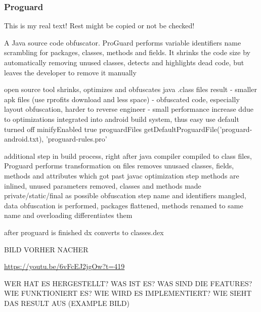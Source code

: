 \subsubsection{Proguard} \label{subsubsection:counter-reengineering-optobf-proguard}
This is my real text! Rest might be copied or not be checked!


%
A Java source code obfuscator. ProGuard performs variable identifiers name scrambling for packages, classes, methods and fields. It shrinks the code size by automatically removing unused classes, detects and highlights dead code, but leaves the developer to remove it manually
\cite{kovachevaMaster}
%

%
open source tool
shrinks, optimizes and obfuscates java .class files
result
- smaller apk files (use rprofits download and less space)
- obfuscated code, especially layout obfuscation, harder to reverse engineer
- small performance increase ddue to optimizations
integrated into android build system, thus easy use
default turned off
minifyEnabled true
proguardFiles getDefaultProguardFile('proguard-android.txt), 'proguard-rules.pro'

additional step in build process, right after java compiler compiled to class files, Proguard performs transformation on files
removes unusaed classes, fields, methods and attributes which got past javac
optimization step methods are inlined, unused parameters removed, classes and methods made private/static/final as possible
obfuscation step name and identifiers mangled, data obfuscation is performed, packages flattened, methods renamed to same name and overloading differentiates them

after proguard is finished dx converts to classes.dex


BILD VORHER NACHER
\cite{munteanLicense}
%



\url{https://youtu.be/6vFcEJ2jgOw?t=419}\newline

WER HAT ES HERGESTELLT? WAS IST ES? WAS SIND DIE FEATURES? WIE FUNKTIONIERT ES? WIE WIRD ES IMPLEMENTIERT? WIE SIEHT DAS RESULT AUS (EXAMPLE BILD)\newline

